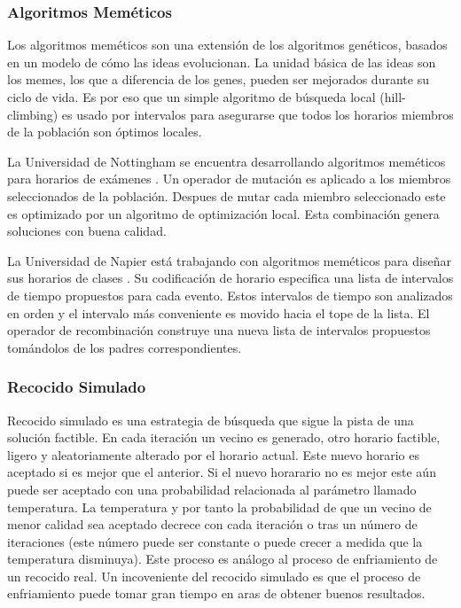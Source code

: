 \subsubsection{Algoritmos Mem\'eticos}

Los algoritmos mem\'eticos son una extensión de los algoritmos gen\'eticos, basados en un modelo de cómo las ideas evolucionan. La unidad básica de las ideas son los memes, los que a diferencia de los genes, pueden ser mejorados durante su ciclo de vida. Es por eso que un simple algoritmo de búsqueda local (hill-climbing) es usado por intervalos
para asegurarse que todos los horarios miembros de la población son óptimos locales.

La Universidad de Nottingham se encuentra desarrollando algoritmos mem\'eticos para horarios de exámenes \cite{EK Burke and JP Newall and RF Weare}. Un operador de mutación es aplicado a los miembros seleccionados de la población. Despues de mutar cada miembro seleccionado este es optimizado por un algoritmo de optimización local. Esta combinación genera soluciones con buena calidad.

La Universidad de Napier está trabajando con algoritmos mem\'eticos para diseñar sus horarios de clases \cite{B Paechter and A Cumming and MG Norman and H Luchian}. Su codificación de horario especifica una lista de intervalos de tiempo propuestos para cada evento. Estos intervalos de tiempo son analizados en orden y el intervalo más conveniente es movido hacia el tope de la lista. El operador de recombinación construye una nueva lista de intervalos propuestos tomándolos de los padres correspondientes.

\subsubsection{Recocido Simulado}

Recocido simulado es una estrategia de búsqueda que sigue la pista de una solución factible. En cada iteración un vecino es generado, otro horario factible, ligero y aleatoriamente alterado por el horario actual. Este nuevo horario es aceptado si es mejor que el anterior. Si el nuevo horarario no es mejor este aún puede ser aceptado con una probabilidad relacionada al parámetro llamado temperatura. La temperatura y por tanto la probabilidad de que un vecino de menor calidad sea aceptado decrece con cada iteración o tras un número de iteraciones (este número puede ser constante o puede crecer a medida que la temperatura disminuya). Este proceso es análogo al proceso de enfriamiento de un recocido real. Un incoveniente del recocido simulado es que el proceso de enfriamiento puede tomar gran tiempo en aras de obtener buenos resultados.

